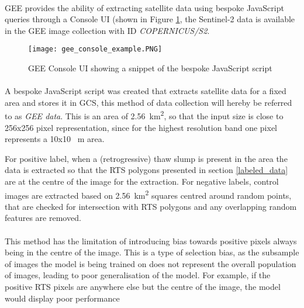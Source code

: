 \paragraph{}
\gls{GEE} provides the ability of extracting satellite data using bespoke JavaScript queries through a Console \gls{UI} (shown in Figure \ref{gee_console_ui}, the Sentinel-2 data is available in the \gls{GEE} image collection with ID \textit{COPERNICUS/S2}.

    \begin{figure}[hbt!]
        \centering
        \texttt{[image: gee\_console\_example.PNG]}
        \caption{\gls{GEE} Console \gls{UI} showing a snippet of the bespoke JavaScript script}
        \label{gee_console_ui}
    \end{figure}

\paragraph{}
A bespoke JavaScript script was created that extracts satellite data for a fixed area and stores it in \gls{GCS}, this method of data collection will hereby be referred to as \textit{\gls{GEE} data}. This is an area of \SI{2.56}{\kilo\metre\squared}, so that the input size is close to 256x256 pixel representation, since for the highest resolution band one pixel represents a 10x10 \SI{}{\metre} area.

For positive label, when a (retrogressive) thaw slump is present in the area the data is extracted so that the \gls{RTS} polygons presented in section \ref{labeled_data} are at the centre of the image for the extraction.
For negative labels, control images are extracted based on \SI{2.56}{\kilo\metre\squared} squares centred around random points, that are checked for intersection with \gls{RTS} polygons and any overlapping random features are removed. 

\paragraph{}
This method has the limitation of introducing bias towards positive pixels always being in the centre of the image. This is a type of selection bias, as the subsample of images the model is being trained on does not represent the overall population of images, leading to poor generalisation of the model. For example, if the positive \gls{RTS} pixels are anywhere else but the centre of the image, the model would display poor performance

